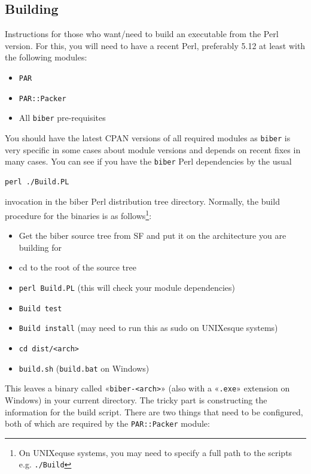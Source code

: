 \documentclass{ltxdockit}
\begin{document}
\subsection{Building}

Instructions for those who want/need to build an executable from the
Perl version. For this, you will need to have a recent Perl,
preferably 5.12 at least with the following modules:

\begin{itemize}
\item \verb+PAR+
\item \verb+PAR::Packer+
\item All \verb+biber+ pre-requisites
\end{itemize}

\noindent You should have the latest CPAN versions of all required modules
as \verb+biber+ is very specific in some cases about module versions and
depends on recent fixes in many cases. You can see if you have the
\verb+biber+ Perl dependencies by the usual

\begin{verbatim}
perl ./Build.PL
\end{verbatim}

\noindent invocation in the biber Perl distribution tree
directory. Normally, the build procedure for the binaries is as
follows\footnote{On UNIXequse systems, you may need to specify a full
  path to the scripts e.g. \texttt{./Build}}:

\begin{itemize}
\item Get the biber source tree from SF and put it on the architecture
  you are building for
\item cd to the root of the source tree
\item \verb+perl Build.PL+ (this will check your module
  dependencies)
\item \verb+Build test+
\item \verb+Build install+ (may need to run this as sudo on
  UNIXesque systems)
\item \verb+cd dist/<arch>+
\item \verb+build.sh+ (\verb+build.bat+ on Windows)
\end{itemize}

\noindent This leaves a binary called «\verb+biber-<arch>+» (also with
a «\verb+.exe+» extension on Windows) in your current directory.
The tricky part is constructing the information for the build
script. There are two things that need to be configured, both of
which are required by the \verb+PAR::Packer+ module:
\end{document}
